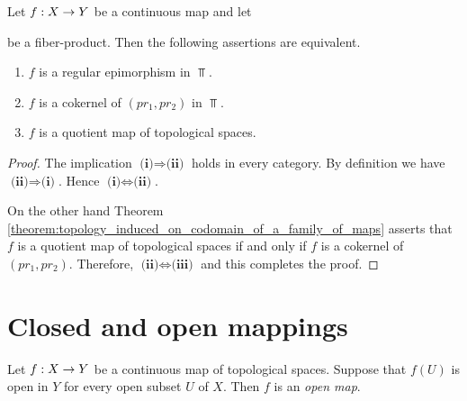 \begin{proposition}\label{proposition:regular_epimorphisms_are_quotients}
	Let $f:X\rightarrow Y$ be a continuous map and let
	\begin{center}
	\end{center}
	be a fiber-product. Then the following assertions are equivalent.
	\begin{enumerate}[label=\emph{\textbf{(\roman*)}}, leftmargin=3.0em]
		\item $f$ is a regular epimorphism in $\Top$.
		\item $f$ is a cokernel of $(pr_1,pr_2)$ in $\Top$.
		\item $f$ is a quotient map of topological spaces.
	\end{enumerate}
\end{proposition}
\begin{proof}
	The implication $\textbf{(i)} \Rightarrow \textbf{(ii)}$ holds in every category. By definition we have $\textbf{(ii)} \Rightarrow \textbf{(i)}$. Hence $\textbf{(i)}\Leftrightarrow \textbf{(ii)}$.

	On the other hand Theorem \ref{theorem:topology_induced_on_codomain_of_a_family_of_maps} asserts that $f$ is a quotient map of topological spaces if and only if $f$ is a cokernel of $(pr_1,pr_2)$. Therefore, $\textbf{(ii)}\Leftrightarrow \textbf{(iii)}$ and this completes the proof.
\end{proof}

\section{Closed and open mappings}

\begin{definition}
	Let $f:X \rightarrow Y$ be a continuous map of topological spaces. Suppose that $f(U)$ is open in $Y$ for every open subset $U$ of $X$. Then $f$ is an \textit{open map}.
\end{definition}


